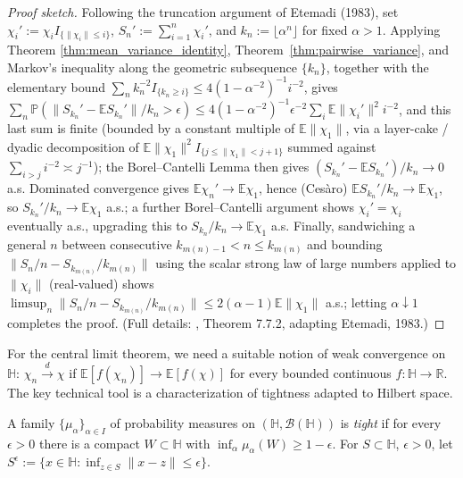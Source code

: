 \begin{proof}[Proof sketch]
Following the truncation argument of Etemadi (1983), set $\chi_i' :=
\chi_iI_{\{\|\chi_i\|\leq i\}}$, $S_n' := \sum_{i=1}^n\chi_i'$, and
$k_n:=\lfloor\alpha^n\rfloor$ for fixed $\alpha>1$. Applying Theorem
\ref{thm:mean_variance_identity}, Theorem~\ref{thm:pairwise_variance}, and
Markov's inequality along the geometric subsequence $\{k_n\}$, together
with the elementary bound $\sum_n k_n^{-2}I_{\{k_n\geq i\}} \leq 4(1-
\alpha^{-2})^{-1}i^{-2}$, gives $\sum_n\mathbb{P}(\|S_{k_n}'-\mathbb{E}
S_{k_n}'\|/k_n>\epsilon) \leq 4(1-\alpha^{-2})^{-1}\epsilon^{-2}\sum_i
\mathbb{E}\|\chi_i'\|^2i^{-2}$, and this last sum is finite (bounded by a
constant multiple of $\mathbb{E}\|\chi_1\|$, via a layer-cake / dyadic
decomposition of $\mathbb{E}\|\chi_1\|^2I_{\{j\leq\|\chi_1\|<j+1\}}$
summed against $\sum_{i>j}i^{-2}\asymp j^{-1}$); the Borel--Cantelli
Lemma then gives $(S_{k_n}'-\mathbb{E}S_{k_n}')/k_n\to 0$ a.s. Dominated
convergence gives $\mathbb{E}\chi_n'\to\mathbb{E}\chi_1$, hence (Cesàro)
$\mathbb{E}S_{k_n}'/k_n\to\mathbb{E}\chi_1$, so $S_{k_n}'/k_n\to
\mathbb{E}\chi_1$ a.s.; a further Borel--Cantelli argument shows
$\chi_i'=\chi_i$ eventually a.s., upgrading this to $S_{k_n}/k_n\to
\mathbb{E}\chi_1$ a.s. Finally, sandwiching a general $n$ between
consecutive $k_{m(n)-1}<n\leq k_{m(n)}$ and bounding $\|S_n/n-
S_{k_{m(n)}}/k_{m(n)}\|$ using the scalar strong law of large numbers
applied to $\|\chi_i\|$ (real-valued) shows $\limsup_n\|S_n/n-
S_{k_{m(n)}}/k_{m(n)}\|\leq 2(\alpha-1)\mathbb{E}\|\chi_1\|$ a.s.; letting
$\alpha\downarrow 1$ completes the proof. (Full details:
\cite{hsingeubank2015}, Theorem 7.7.2, adapting Etemadi, 1983.)
\end{proof}

For the central limit theorem, we need a suitable notion of weak
convergence on $\mathbb{H}$: $\chi_n\xrightarrow{d}\chi$ if $\mathbb{E}
[f(\chi_n)]\to\mathbb{E}[f(\chi)]$ for every bounded continuous
$f:\mathbb{H}\to\mathbb{R}$. The key technical tool is a characterization
of tightness adapted to Hilbert space.

\begin{definition}
\label{def:tightness}
A family $\{\mu_\alpha\}_{\alpha\in I}$ of probability measures on
$(\mathbb{H},\mathcal{B}(\mathbb{H}))$ is \emph{tight} if for every
$\epsilon>0$ there is a compact $W\subset\mathbb{H}$ with $\inf_\alpha
\mu_\alpha(W)\geq 1-\epsilon$. For $S\subset\mathbb{H}$, $\epsilon>0$, let
$S^\epsilon:=\{x\in\mathbb{H}:\inf_{z\in S}\|x-z\|\leq\epsilon\}$.
\end{definition}

